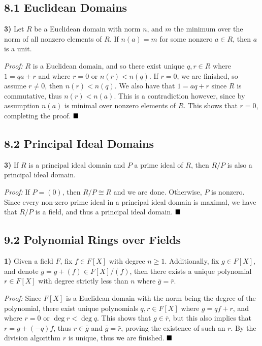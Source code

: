 \documentclass[12pt]{article}
\newcommand{\proof}{\textit{Proof: }}
\newcommand{\done}{\ensuremath{\strut\hfill\blacksquare}}
\begin{document}
\pagestyle{fancy}

\setlength{\parindent}{0in}
\setlength{\parskip}{0.1in}

\subsection*{8.1 Euclidean Domains}

\textbf{3)}
Let \( R \) be a Euclidean domain with norm \( n \), and \( m \) the minimum
over the norm of all nonzero elements of \( R \).
If \( n(a) = m \) for some nonzero \( a \in R \), then \( a \) is a unit.

\proof
\( R \) is a Euclidean domain, and so there exist unique \( q, r \in R \) where
\( 1 = qa + r \) and where \( r = 0 \) or \( n(r) < n(q) \).
If \( r = 0 \), we are finished, so assume \( r \ne 0 \), then
\( n(r) < n(q) \).
We also have that \( 1 = aq + r \) since \( R \) is commutative, thus
\( n(r) < n(a) \).
This is a contradiction however, since by assumption \( n(a) \) is minimal
over nonzero elements of \( R \).
This shows that \( r = 0 \), completing the proof.
\done

\subsection*{8.2 Principal Ideal Domains}

\textbf{3)}
If \( R \) is a principal ideal domain and \( P \) a prime ideal of \( R \),
then \( R/P \) is also a principal ideal domain.

\proof
If \( P = (0) \), then \( R/P \cong R \) and we are done.
Otherwise, \( P \) is nonzero.
Since every non-zero prime ideal in a principal ideal domain is maximal, we
have that \( R/P \) is a field, and thus a principal ideal domain.
\done

\subsection*{9.2 Polynomial Rings over Fields}

\textbf{1)}
Given a field \( F \), fix \( f \in F[X] \) with degree \( n \geq 1 \).
Additionally, fix \( g \in F[X] \), and denote
\( \bar{g} = g + (f) \in F[X]/(f) \), then there exists a unique polynomial
\( r \in F[X] \) with degree strictly less than \( n \) where
\( \bar{g} = \bar{r} \).

\proof
Since \( F[X] \) is a Euclidean domain with the norm being the degree of the
polynomial, there exist unique polynomials \( q, r \in F[X] \) where
\( g = qf + r \), and where \( r = 0 \) or \( \deg r < \deg q \).
This shows that \( g \in \bar{r} \), but this also implies that
\( r = g + (-q)f \), thus \( r \in \bar{g} \) and \( \bar{g} = \bar{r} \),
proving the existence of such an \( r \).
By the division algorithm \( r \) is unique, thus we are finished.
\done
\end{document}
